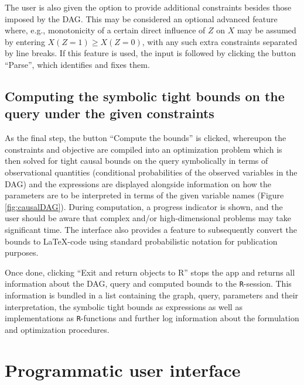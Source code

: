The user is also given the option to provide additional constraints besides those imposed by the DAG. This may be considered an optional advanced feature where, e.g., monotonicity of a certain direct influence of \(Z\) on \(X\) may be assumed by entering \(X(Z=1)\ge X(Z=0)\), with any such extra constraints separated by line breaks. If this feature is used, the input is followed by clicking the button ``Parse'', which identifies and fixes them.

\hypertarget{computing-the-symbolic-tight-bounds-on-the-query-under-the-given-constraints}{%
\subsection{Computing the symbolic tight bounds on the query under the given constraints}\label{computing-the-symbolic-tight-bounds-on-the-query-under-the-given-constraints}}

As the final step, the button ``Compute the bounds'' is clicked, whereupon the constraints and objective are compiled into an optimization problem which is then solved for tight causal bounds on the query symbolically in terms of observational quantities (conditional probabilities of the observed variables in the DAG) and the expressions are displayed alongside information on how the parameters are to be interpreted in terms of the given variable names (Figure \ref{fig:causalDAG}). During computation, a progress indicator is shown, and the user should be aware that complex and/or high-dimensional problems may take significant time. The interface also provides a feature to subsequently convert the bounds to \LaTeX-code using standard probabilistic notation for publication purposes.

Once done, clicking ``Exit and return objects to R'' stops the  app and returns all information about the DAG, query and computed bounds to the \texttt{R}-session.
This information is bundled in a list containing the graph, query, parameters and their interpretation, the symbolic tight bounds as expressions as well as implementations as \texttt{R}-functions and further log information about the formulation and optimization procedures.

\hypertarget{programmatic-user-interface}{%
\section{Programmatic user interface}\label{programmatic-user-interface}}


